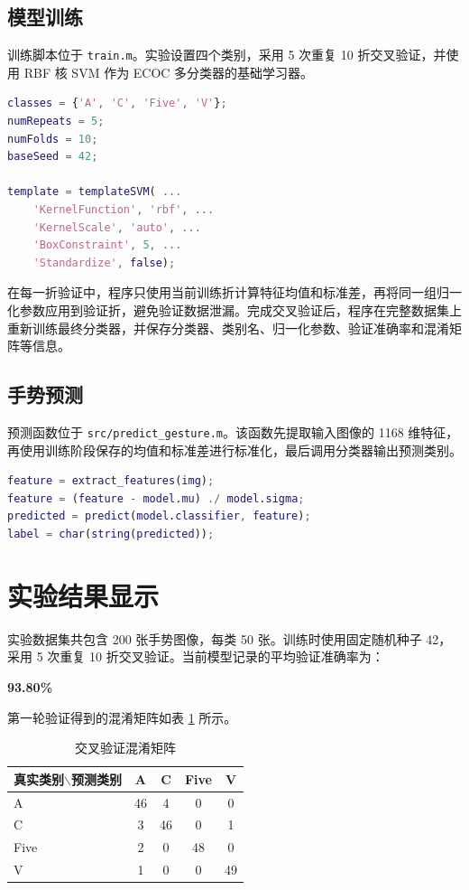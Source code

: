 \documentclass[UTF8,a4paper,10pt]{ctexart}
\begin{document}
\subsection{模型训练}
训练脚本位于 \texttt{train.m}。实验设置四个类别，采用 5 次重复 10 折交叉验证，并使用 RBF 核 SVM 作为 ECOC 多分类器的基础学习器。

\begin{lstlisting}[title=训练配置核心代码,frame=trbl,language=Matlab]
classes = {'A', 'C', 'Five', 'V'};
numRepeats = 5;
numFolds = 10;
baseSeed = 42;

template = templateSVM( ...
    'KernelFunction', 'rbf', ...
    'KernelScale', 'auto', ...
    'BoxConstraint', 5, ...
    'Standardize', false);
\end{lstlisting}

在每一折验证中，程序只使用当前训练折计算特征均值和标准差，再将同一组归一化参数应用到验证折，避免验证数据泄漏。完成交叉验证后，程序在完整数据集上重新训练最终分类器，并保存分类器、类别名、归一化参数、验证准确率和混淆矩阵等信息。

\subsection{手势预测}
预测函数位于 \texttt{src/predict\_gesture.m}。该函数先提取输入图像的 1168 维特征，再使用训练阶段保存的均值和标准差进行标准化，最后调用分类器输出预测类别。

\begin{lstlisting}[title=预测核心代码,frame=trbl,language=Matlab]
feature = extract_features(img);
feature = (feature - model.mu) ./ model.sigma;
predicted = predict(model.classifier, feature);
label = char(string(predicted));
\end{lstlisting}

\section{实验结果显示}
实验数据集共包含 200 张手势图像，每类 50 张。训练时使用固定随机种子 42，采用 5 次重复 10 折交叉验证。当前模型记录的平均验证准确率为：
\begin{center}
  \textbf{93.80\%}
\end{center}

第一轮验证得到的混淆矩阵如表 \ref{tab:confusion} 所示。
\begin{table}[!htbp]
  \centering
  \begin{tabular}{lcccc}
  \toprule
  真实类别$\backslash$预测类别 & A & C & Five & V\\
  \midrule
  A & 46 & 4 & 0 & 0\\
  C & 3 & 46 & 0 & 1\\
  Five & 2 & 0 & 48 & 0\\
  V & 1 & 0 & 0 & 49\\
  \bottomrule
  \end{tabular}
  \caption{交叉验证混淆矩阵}
  \label{tab:confusion}
\end{table}
\end{document}
